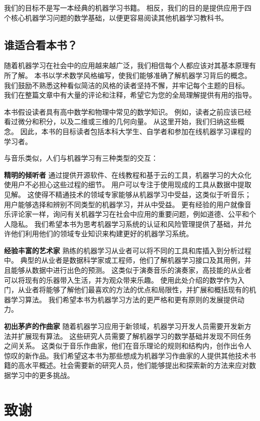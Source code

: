 我们的目标不是写一本经典的机器学习书籍。 相反，我们的目的是提供应用于四个核心机器学习问题的数学基础，以便更容易阅读其他机器学习教科书。

\section*{谁适合看本书？}

随着机器学习在社会中的应用越来越广泛，我们相信每个人都应该对其基本原理有所了解。 本书以学术数学风格编写，使我们能够准确了解机器学习背后的概念。 我们鼓励不熟悉这种看似简洁的风格的读者坚持不懈，并牢记每个主题的目标。 我们在整篇文章中有大量的评论和注释，希望它为您的全局理解提供有用的指导。

本书假设读者具有高中数学和物理中常见的数学知识。 例如，读者之前应该已经看过微分和积分，以及二维或三维的几何向量。 从这里开始，我们归纳这些概念。 因此，本书的目标读者包括本科大学生、自学者和参加在线机器学习课程的学习者。

与音乐类似，人们与机器学习有三种类型的交互：

\textbf{精明的倾听者} 通过提供开源软件、在线教程和基于云的工具，机器学习的大众化使用户不必担心这些过程的细节。 用户可以专注于使用现成的工具从数据中提取见解。 这使得不精通技术的领域专家能够从机器学习中受益，这类似于听音乐； 用户能够选择和辨别不同类型的机器学习，并从中受益。 更有经验的用户就像音乐评论家一样，询问有关机器学习在社会中应用的重要问题，例如道德、公平和个人隐私。 我们希望本书为思考机器学习系统的认证和风险管理提供了基础，并允许他们利用他们的领域专业知识来构建更好的机器学习系统。

\textbf{经验丰富的艺术家} 熟练的机器学习从业者可以将不同的工具和库插入到分析过程中。 典型的从业者是数据科学家或工程师，他们了解机器学习接口及其用例，并且能够从数据中进行出色的预测。 这类似于演奏音乐的演奏家，高技能的从业者可以将现有的乐器带入生活，并为观众带来乐趣。 使用此处介绍的数学作为入门，从业者将能够了解他们最喜欢的方法的优点和局限性，并扩展和概括现有的机器学习算法。 我们希望本书为机器学习方法的更严格和更有原则的发展提供动力。

\textbf{初出茅庐的作曲家} 随着机器学习应用于新领域，机器学习开发人员需要开发新方法并扩展现有算法。 这些研究人员需要了解机器学习的数学基础并发现不同任务之间关系。 这类似于音乐作曲家，他们在音乐理论的规则和结构内，创作出令人惊叹的新作品。我们希望这本书为那些想成为机器学习作曲家的人提供其他技术书籍的高水平概述。社会需要新的研究人员，他们能够提出和探索新的方法来应对数据学习中的更多挑战。

\chapter*{致谢}

